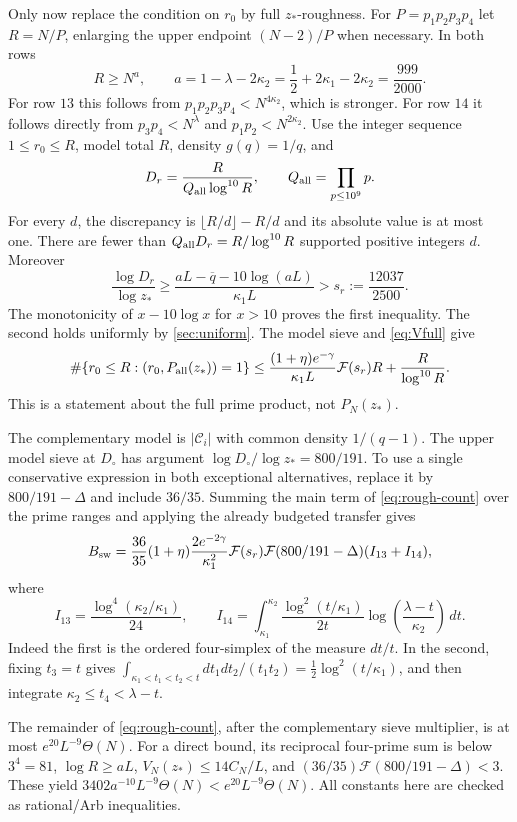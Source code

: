 \documentclass[11pt]{article}
\theoremstyle{definition}
\newcommand{\Th}{\Theta(N)}
\newcommand{\Fup}{\mathcal F}
\begin{document}
Only now replace the condition on $r_0$ by full $z_*$-roughness.
For $P=p_1p_2p_3p_4$ let $R=N/P$, enlarging the upper endpoint
$(N-2)/P$ when necessary.  In both rows
\[
 R\ge N^a,\qquad
 a=1-\lambda-2\kappa_2
  =\frac12+2\kappa_1-2\kappa_2=\frac{999}{2000}.
\]
For row $13$ this follows from $p_1p_2p_3p_4<N^{4\kappa_2}$,
which is stronger.  For row $14$ it follows directly from
$p_3p_4<N^{\lambda}$ and $p_1p_2<N^{2\kappa_2}$.
Use the integer sequence $1\le r_0\le R$, model total $R$,
density $g(q)=1/q$, and
\[
 D_r=\frac{R}{Q_{\rm all}\log^{10}R},\qquad
 Q_{\rm all}=\prod_{p\le10^9}p.
\]
For every $d$, the discrepancy is $\lfloor R/d\rfloor-R/d$ and its
absolute value is at most one.  There are fewer than
$Q_{\rm all}D_r=R/\log^{10}R$ supported positive integers $d$.
Moreover
\[
 \frac{\log D_r}{\log z_*}
 \ge\frac{aL-\overline q-10\log(aL)}{\kappa_1L}
 >s_r:=\frac{12037}{2500}.
\]
The monotonicity of $x-10\log x$ for $x>10$ proves the first
inequality.  The second holds uniformly by \cref{sec:uniform}.
The model sieve and \eqref{eq:Vfull} give
\begin{equation}\label{eq:rough-count}
 \#\{r_0\le R:(r_0,P_{\rm all}(z_*))=1\}
 \le\frac{(1+\eta)e^{-\gamma}}{\kappa_1L}\Fup(s_r)R
                       +\frac{R}{\log^{10}R}.
\end{equation}
This is a statement about the full prime product, not $P_N(z_*)$.

The complementary model is $|\mathcal C_i|$ with common density
$1/(q-1)$.  The upper model sieve at $D_\circ$ has argument
$\log D_\circ/\log z_*=800/191$.
To use a single conservative expression in both exceptional
alternatives, replace it by $800/191-\Delta$ and include $36/35$.
Summing the main term of \eqref{eq:rough-count} over the prime ranges
and applying the already budgeted transfer gives
\begin{equation}\label{eq:Bswitch}
 B_{\rm sw}=\frac{36}{35}(1+\eta)
       \frac{2e^{-2\gamma}}{\kappa_1^2}
       \Fup(s_r)\Fup(800/191-\Delta)(I_{13}+I_{14}),
\end{equation}
where
\[
 I_{13}=\frac{\log^4(\kappa_2/\kappa_1)}{24},\qquad
 I_{14}=\int_{\kappa_1}^{\kappa_2}
       \frac{\log^2(t/\kappa_1)}{2t}
       \log\left(\frac{\lambda-t}{\kappa_2}\right)\,dt.
\]
Indeed the first is the ordered four-simplex of the measure $dt/t$.
In the second, fixing $t_3=t$ gives
$\int_{\kappa_1<t_1<t_2<t}dt_1dt_2/(t_1t_2)
=\tfrac12\log^2(t/\kappa_1)$, and then integrate
$\kappa_2\le t_4<\lambda-t$.

The remainder of \eqref{eq:rough-count}, after the complementary
sieve multiplier, is at most $e^{20}L^{-9}\Th$.
For a direct bound, its reciprocal four-prime sum is below
$3^4=81$, $\log R\ge aL$, $V_N(z_*)\le14C_N/L$,
and $(36/35)\Fup(800/191-\Delta)<3$.
These yield $3402a^{-10}L^{-9}\Th<e^{20}L^{-9}\Th$.
All constants here are checked as rational/Arb inequalities.
\end{document}
